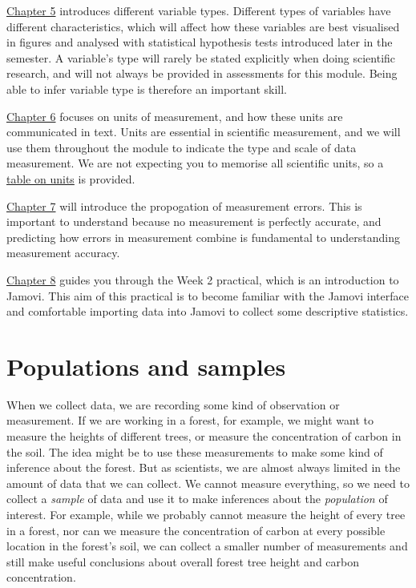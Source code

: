 \documentclass[
]{scrbook}
\begin{document}
\protect\hyperlink{Chapter_5}{Chapter 5} introduces different variable types. Different types of variables have different characteristics, which will affect how these variables are best visualised in figures and analysed with statistical hypothesis tests introduced later in the semester.
A variable's type will rarely be stated explicitly when doing scientific research, and will not always be provided in assessments for this module.
Being able to infer variable type is therefore an important skill.

\protect\hyperlink{Chapter_6}{Chapter 6} focuses on units of measurement, and how these units are communicated in text.
Units are essential in scientific measurement, and we will use them throughout the module to indicate the type and scale of data measurement.
We are not expecting you to memorise all scientific units, so a \protect\hyperlink{appendixA_units}{table on units} is provided.

\protect\hyperlink{Chapter_7}{Chapter 7} will introduce the propogation of measurement errors.
This is important to understand because no measurement is perfectly accurate, and predicting how errors in measurement combine is fundamental to understanding measurement accuracy.

\protect\hyperlink{Chapter_8}{Chapter 8} guides you through the Week 2 practical, which is an introduction to Jamovi.
This aim of this practical is to become familiar with the Jamovi interface and comfortable importing data into Jamovi to collect some descriptive statistics.

\hypertarget{Chapter_4}{%
\chapter{Populations and samples}\label{Chapter_4}}

When we collect data, we are recording some kind of observation or measurement.
If we are working in a forest, for example, we might want to measure the heights of different trees, or measure the concentration of carbon in the soil.
The idea might be to use these measurements to make some kind of inference about the forest.
But as scientists, we are almost always limited in the amount of data that we can collect.
We cannot measure everything, so we need to collect a \emph{sample} of data and use it to make inferences about the \emph{population} of interest.
For example, while we probably cannot measure the height of every tree in a forest, nor can we measure the concentration of carbon at every possible location in the forest's soil, we can collect a smaller number of measurements and still make useful conclusions about overall forest tree height and carbon concentration.
\end{document}
